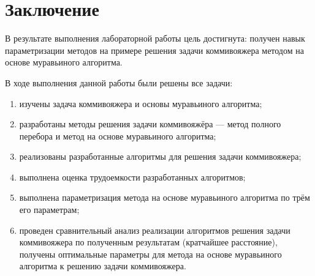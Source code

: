 \chapter*{Заключение}

В результате выполнения лабораторной работы цель достигнута: получен навык параметризации методов на примере решения задачи коммивояжера методом на основе муравьиного алгоритма.

В ходе выполнения данной работы были решены все задачи:
\begin{enumerate}[label={\arabic*)}]
    \item изучены задача коммивояжера и основы муравьиного алгоритма;
	\item разработаны методы решения задачи коммивояжёра --- метод полного перебора и метод на основе муравьиного алгоритма;
	\item реализованы разработанные алгоритмы для решения задачи коммивояжера;
	\item выполнена оценка трудоемкости разработанных алгоритмов;
        \item выполнена параметризация метода на основе муравьиного алгоритма по трём его параметрам;
	\item проведен сравнительный анализ реализации алгоритмов решения задачи коммивояжера по полученным результатам (кратчайшее расстояние), получены оптимальные параметры для метода на основе муравьиного алгоритма к решению задачи коммивояжера.
\end{enumerate}

